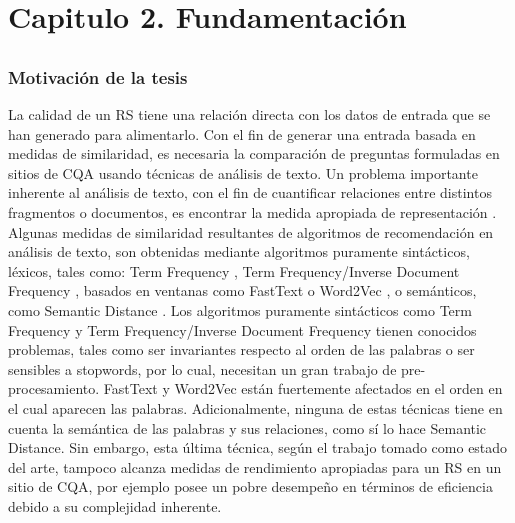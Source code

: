 \chapter*{Capitulo 2. \textbf{Fundamentación}}\label{ch:fundamentacion}

\section*{}
\addtocounter{section}{1}
\setcounter{subsection}{0}

\subsection{Motivación de la tesis}
 La calidad de un RS tiene una relación directa con los datos de entrada que se han generado para alimentarlo. Con el fin de generar una entrada basada en medidas de similaridad, es necesaria la comparación de preguntas formuladas en sitios de CQA usando técnicas de análisis de texto. Un problema importante inherente al análisis de texto, con el fin de cuantificar relaciones entre distintos fragmentos o documentos, es encontrar la medida apropiada de representación \citep{gonzalez2017comparative}. Algunas medidas de similaridad resultantes de algoritmos de recomendación en análisis de texto, son obtenidas mediante algoritmos puramente sintácticos, léxicos, tales como: Term Frequency \citep{salton5mcgill}, Term Frequency/Inverse Document Frequency \citep{baeza1999modern}, basados en ventanas como FastText \citep{joulin2016fasttext} o Word2Vec \citep{mikolov2013efficient}, o semánticos, como Semantic Distance \citep{li2006sentence}. Los algoritmos puramente sintácticos como Term Frequency y Term Frequency/Inverse Document Frequency tienen conocidos problemas, tales como ser invariantes respecto al orden de las palabras o ser sensibles a stopwords, por lo cual, necesitan un gran trabajo de pre-procesamiento. FastText y Word2Vec están fuertemente afectados en el orden en el cual aparecen las palabras. Adicionalmente, ninguna de estas técnicas tiene en cuenta la semántica de las palabras y sus relaciones, como sí lo hace Semantic Distance. Sin embargo, esta última técnica, según el trabajo tomado como estado del arte, tampoco alcanza medidas de rendimiento apropiadas para un RS en un sitio de CQA, por ejemplo posee un pobre desempeño en términos de eficiencia debido a su complejidad inherente.

